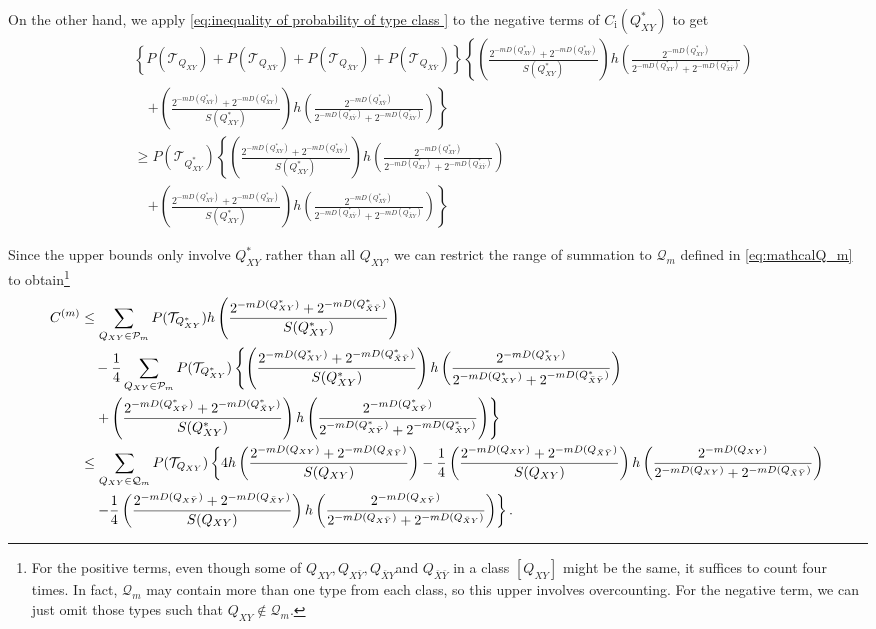 \documentclass[journal,onecolumn]{IEEEtran}
\theoremstyle{definition}
\theoremstyle{remark}
\newcommand{\Dxy}{D({Q_{XY}})}
\newcommand{\Dxby}{D({Q_{X\bar{Y}}})}
\newcommand{\Dbxy}{D({Q_{\bar{X}Y}})}
\newcommand{\Dbxby}{D({Q_{\bar{X}\bar{Y}}})}
\newcommand{\Qxy}{Q_{XY}}
\newcommand{\Qxby}{Q_{X\bar{Y}}}
\newcommand{\Qbxy}{Q_{\bar{X}Y}}
\newcommand{\Qbxby}{Q_{\bar{X}\bar{Y}}}
\newcommand{\Dxyas}{D(\Qxy^*)}
\newcommand{\Dxbyas}{D(\Qxby^*)}
\newcommand{\Dbxyas}{D(\Qbxy^*)}
\newcommand{\Dbxbyas}{D(\Qbxby^*)}
\begin{document}
    On the other hand, we apply \eqref{eq:inequality of probability of type class } to the negative terms of $C_{\mathrm{i}}(\Qxy^*)$ to get
    \begin{align*}
        &\left\{P(\mathcal{T}_{\Qxy})+P(\mathcal{T}_{\Qxby})+P(\mathcal{T}_{\Qbxy})+P(\mathcal{T}_{\Qbxby}) \right\} \left\{\left(\frac{2^{-m\Dxyas}+2^{-m\Dbxbyas}}{S(\Qxy^*)}\right)h\left(\frac{2^{-m\Dxyas}}{2^{-m\Dxyas}+2^{-m\Dbxbyas}}\right)\right.\\
        &\quad\left.+\left(\frac{2^{-m\Dxbyas}+2^{-m\Dbxyas}}{S(\Qxy^*)}\right)h\left(\frac{2^{-m\Dxbyas}}{2^{-m\Dxbyas}+2^{-m\Dbxyas}}\right)\right\}\\
        & \geq P(\mathcal{T}_{\Qxy^*}) \left\{\left(\frac{2^{-m\Dxyas}+2^{-m\Dbxbyas}}{S(\Qxy^*)}\right)h\left(\frac{2^{-m\Dxyas}}{2^{-m\Dxyas}+2^{-m\Dbxbyas}}\right)\right.\\
        &\quad\left.+\left(\frac{2^{-m\Dxbyas}+2^{-m\Dbxyas}}{S(\Qxy^*)}\right)h\left(\frac{2^{-m\Dxbyas}}{2^{-m\Dxbyas}+2^{-m\Dbxyas}}\right)\right\}
    \end{align*}

    Since the upper bounds only involve $\Qxy^*$ rather than all $\Qxy$, we can restrict the range of summation to $\mathcal{Q}_m$ defined in \eqref{eq:mathcalQ_m} to obtain\footnote{For the positive terms, even though some of $\Qxy,\Qxby,\Qbxy$and $\Qbxby$ in a class $[\Qxy]$ might  be the same, it suffices to count four times. In fact, $\mathcal{Q}_m$ may contain more than one type from each class, so this upper involves overcounting. For the negative term, we can just omit those types such that $\Qxy \notin \mathcal{Q}_m$.}
    \begin{align}
        C^{(m)}&\leq \sum_{\Qxy \in \mathcal{P}_m} P(\mathcal{T}_{\Qxy^*}) h\left( \frac{2^{-m\Dxyas}+2^{-m\Dbxbyas}}{S(\Qxy^*)} \right)\notag\\
        &\quad -\frac{1}{4}\sum_{\Qxy \in \mathcal{P}_m} P(\mathcal{T}_{\Qxy^*})\left\{\left(\frac{2^{-m\Dxyas}+2^{-m\Dbxbyas}}{S(\Qxy^*)}\right)h\left(\frac{2^{-m\Dxyas}}{2^{-m\Dxyas}+2^{-m\Dbxbyas}}\right)\right.\notag\\
        &\quad \left.+\left(\frac{2^{-m\Dxbyas}+2^{-m\Dbxyas}}{S(\Qxy^*)}\right)h\left(\frac{2^{-m\Dxbyas}}{2^{-m\Dxbyas}+2^{-m\Dbxyas}}\right)\right\}\notag\\
        & \leq \sum_{\Qxy\in \mathcal{Q}_m} P(\mathcal{T}_{\Qxy}) \left\{ 4h\left( \frac{2^{-m\Dxy}+2^{-m\Dbxby}}{S(\Qxy)} \right) - \frac{1}{4}\left(\frac{2^{-m\Dxy}+2^{-m\Dbxby}}{S(\Qxy)}\right)h\left(\frac{2^{-m\Dxy}}{2^{-m\Dxy}+2^{-m\Dbxby}}\right)\right.\notag\\ 
        &\quad \left.-\frac{1}{4}\left(\frac{2^{-m\Dxby}+2^{-m\Dbxy}}{S(\Qxy)}\right)h\left(\frac{2^{-m\Dxby}}{2^{-m\Dxby}+2^{-m\Dbxy}}\right)\right\}. \label{eq:confined type expression}
    \end{align}
    
\end{document}
